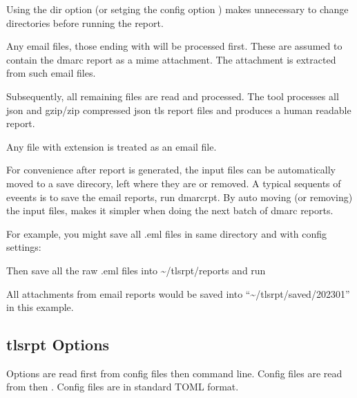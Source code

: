 \documentclass[letterpaper,10pt,english]{sphinxmanual}
\begin{document}
\sphinxAtStartPar
Using the \textendash{}dir option (or setging the config option ) makes unnecessary to change directories before
running the report.

\sphinxAtStartPar
Any email files, those ending with  will be processed first. These are assumed to
contain the dmarc report as a mime attachment. The attachment is extracted from such email
files.

\sphinxAtStartPar
Subsequently, all remaining files are read and processed. The tool processes all json
and gzip/zip compressed json tls report files and produces a human readable report.

\sphinxAtStartPar
Any file with extension  is treated as an email file.

\sphinxAtStartPar
For convenience after report is generated, the input files can be automatically moved to a save
direcory, left where they are or removed. A typical sequents of eveents is to save
the email reports, run dmarc\sphinxhyphen{}rpt.  By auto moving (or removing) the input files, makes it simpler
when doing the next batch of dmarc reports.

\sphinxAtStartPar
For example, you might save all .eml files in same directory and with config settings:

\begin{sphinxVerbatim}[commandchars=\\\{\}]
  
  
  
\end{sphinxVerbatim}

\sphinxAtStartPar
Then save all the raw .eml files into \textasciitilde{}/tlsrpt/reports and run

\begin{sphinxVerbatim}[commandchars=\\\{\}]
\end{sphinxVerbatim}

\sphinxAtStartPar
All attachments from email reports would be saved into “\textasciitilde{}/tlsrpt/saved/2023\sphinxhyphen{}01”
in this example.


\subsection{tls\sphinxhyphen{}rpt Options}
\label{\detokenize{Readme-TLS:tls-rpt-options}}
\sphinxAtStartPar
Options are read first from config files then command line. Config files are read
from  then .  Config files
are in standard TOML format.
\end{document}
